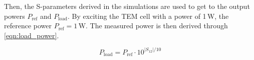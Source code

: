 Then, the S-parameters derived in the simulations are used to get to the output powers $P_\mathrm{ref}$ and $P_\mathrm{load}$. By exciting the TEM cell with a power of 1\,W, the reference power $P_\mathrm{ref}=1\,\mathrm{W}$. The measured power is then derived through \autoref{eqn:load_power}.

\begin{equation}
    P_\mathrm{load}=P_\mathrm{ref}\cdot10^{|S_\mathrm{12}|/10}
    \label{eqn:load_power}
\end{equation}



